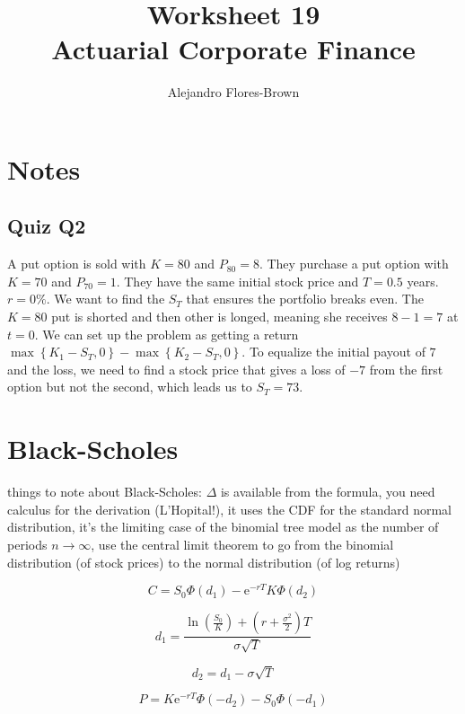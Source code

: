 \documentclass[12pt, letterpaper]{article}
\title{Worksheet 19 \\ Actuarial Corporate Finance}
\author{Alejandro Flores-Brown}
\newcommand{\e}{\mathrm{e}}
\begin{document}
    \maketitle

    \section{Notes}

    \subsection{Quiz Q2}

    A put option is sold with \(K = 80\) and \(P_80 = 8\). They purchase a put option with \(K = 70\) and \(P_{70} = 1\). They have the same initial stock price and \(T = 0.5\) years. \(r = 0\%\). We want to find the \(S_T\) that ensures the portfolio breaks even. The \(K = 80\) put is shorted and then other is longed, meaning she receives \(8 - 1 = 7\) at \(t = 0\). We can set up the problem as getting a return \(\max\left\{ K_1 - S_T, 0 \right\} - \max\left\{ K_2 - S_T, 0 \right\}\). To equalize the initial payout of \(7\) and the loss, we need to find a stock price that gives a loss of \(-7\) from the first option but not the second, which leads us to \(S_T = 73\).
    
    \section{Black-Scholes}

    things to note about Black-Scholes: \(\Delta\) is available from the formula, you need calculus for the derivation (L'Hopital!), it uses the CDF for the standard normal distribution, it's the limiting case of the binomial tree model as the number of periods \(n \rightarrow \infty\), use the central limit theorem to go from the binomial distribution (of stock prices) to the normal distribution (of log returns)

    \[ C = S_0 \Phi(d_1) - \e^{-rT} K \Phi(d_2)  \]

    \[ d_1 = \frac{\ln(\frac{S_0}{K}) + \left(r + \frac{\sigma^2}{2}\right) T}{\sigma \sqrt{T} }   \]

    \[ d_2 = d_1 - \sigma \sqrt{T}  \]

    \[ P = K \e^{-rT} \Phi(-d_2) - S_0 \Phi(-d_1)   \]

    
\end{document}
